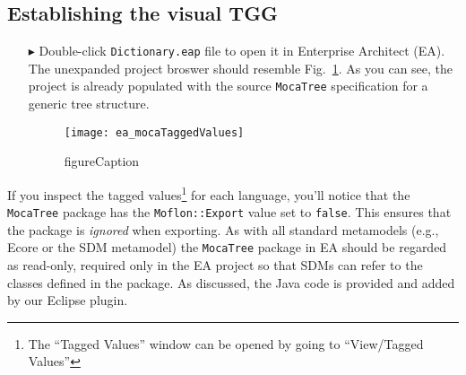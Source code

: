 \newpage
\hypertarget{initialize vis}{}
\subsection{Establishing the visual TGG}
\visHeader

\begin{itemize}

\item[$\blacktriangleright$] Double-click \texttt{Dict\-ion\-ary.eap} file to open it in Enterprise Architect (EA). The unexpanded project broswer should
resemble Fig.~\ref{ea:mocaTagged}. As you can see, the project is already populated with the source \texttt{MocaTree} specification for a generic tree
structure.

\begin{figure}[htpb]
\begin{center}
  \texttt{[image: ea\_mocaTaggedValues]}
  \caption{figureCaption}
  \label{ea:mocaTagged}
\end{center}
\end{figure}

\end{itemize}

If you inspect the tagged values\footnote{The ``Tagged Values'' window can be opened by going to ``View/Tagged Values''} for each language, you'll notice that
the \texttt{MocaTree} package has the \texttt{Moflon::Export} value set to \texttt{false}. This ensures that the package is \emph{ignored} when exporting. As
with all standard metamodels (e.g., Ecore or the SDM metamodel) the \texttt{MocaTree} package in EA should be regarded as read-only, required only in the
EA project so that SDMs can refer to the classes defined in the package. As discussed, the Java code is provided and added by our Eclipse plugin.


